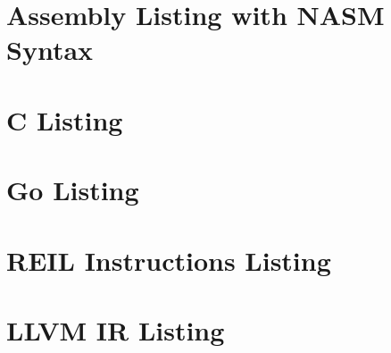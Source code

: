 \documentclass[12pt, a4paper]{article}
\begin{document}
\section{Assembly Listing with NASM Syntax}



\pagebreak

\section{C Listing}



\pagebreak

\section{Go Listing}



\pagebreak

\section{REIL Instructions Listing}



\pagebreak

\section{LLVM IR Listing}


\end{document}
